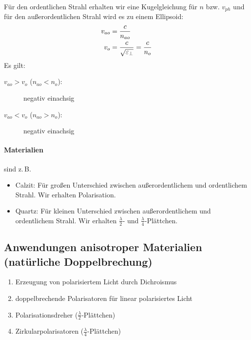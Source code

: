 Für den ordentlichen Strahl erhalten wir eine Kugelgleichung für $n$
bzw. $v_{ph}$ und für den außerordentlichen Strahl wird es zu einem
Ellipsoid:
\begin{align*}
  v_{ao} &= \frac{c}{n_{ao}}\\
  v_o &= \frac{c}{\sqrt{\varepsilon_\bot}} = \frac{c}{n_{o}}\\
\end{align*}
Es gilt:
\begin{description}
\item[$v_{ao}>v_o$ ($n_{ao}<n_o$):] negativ einachsig
\item[$v_{ao}<v_o$ ($n_{ao}>n_o$):] negativ einachsig
\end{description}



\paragraph{Materialien}
sind z.\,B.
\begin{itemize}
\item Calzit: Für großen Unterschied zwischen außerordentlichem und
  ordentlichem Strahl. Wir erhalten Polarisation.
\item Quartz: Für kleinen Unterschied zwischen außerordentlichem und
  ordentlichem Strahl. Wir erhalten $\frac{\lambda}{2}$- und
  $\frac{\lambda}{4}$-Plättchen.
\end{itemize}

\subsection{Anwendungen anisotroper Materialien (natürliche
  Doppelbrechung)}
\begin{enumerate}
\item Erzeugung von polarisiertem Licht durch Dichroismus
\item doppelbrechende Polarisatoren für linear polarisiertes Licht
\item Polarisationsdreher ($\frac{\lambda}{2}$-Plättchen)
\item Zirkularpolarisatoren ($\frac{\lambda}{4}$-Plättchen)
\end{enumerate}

